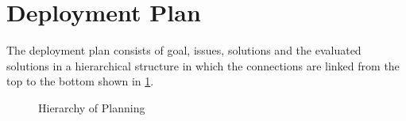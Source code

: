 
\section{Deployment Plan}

The deployment plan consists of goal, issues, solutions and the evaluated solutions in a hierarchical structure in which the connections are linked from the top to the bottom shown in \ref{img:hier}. 

\begin{figure}[ht]
\centering
\caption{Hierarchy of Planning}
\label{img:hier}
\end{figure}




